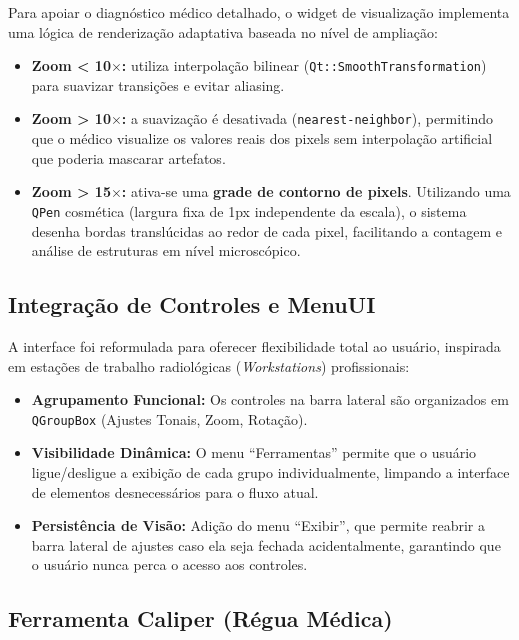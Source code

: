\documentclass[12pt, a4paper]{article}
\begin{document}
Para apoiar o diagnóstico médico detalhado, o widget de visualização implementa uma lógica de renderização adaptativa baseada no nível de ampliação:

\begin{itemize}
  \item \textbf{Zoom < 10$\times$:} utiliza interpolação bilinear (\texttt{Qt::SmoothTransformation}) para suavizar transições e evitar aliasing.
  \item \textbf{Zoom > 10$\times$:} a suavização é desativada (\texttt{nearest-neighbor}), permitindo que o médico visualize os valores reais dos pixels sem interpolação artificial que poderia mascarar artefatos.
  \item \textbf{Zoom > 15$\times$:} ativa-se uma \textbf{grade de contorno de pixels}. Utilizando uma \texttt{QPen} cosmética (largura fixa de 1px independente da escala), o sistema desenha bordas translúcidas ao redor de cada pixel, facilitando a contagem e análise de estruturas em nível microscópico.
\end{itemize}

\subsection{Integração de Controles e MenuUI}

A interface foi reformulada para oferecer flexibilidade total ao usuário, inspirada em estações de trabalho radiológicas (\textit{Workstations}) profissionais:

\begin{itemize}
    \item \textbf{Agrupamento Funcional:} Os controles na barra lateral são organizados em \texttt{QGroupBox} (Ajustes Tonais, Zoom, Rotação).
    \item \textbf{Visibilidade Dinâmica:} O menu ``Ferramentas'' permite que o usuário ligue/desligue a exibição de cada grupo individualmente, limpando a interface de elementos desnecessários para o fluxo atual.
    \item \textbf{Persistência de Visão:} Adição do menu ``Exibir'', que permite reabrir a barra lateral de ajustes caso ela seja fechada acidentalmente, garantindo que o usuário nunca perca o acesso aos controles.
\end{itemize}

\subsection{Ferramenta Caliper (Régua Médica)}
\end{document}
